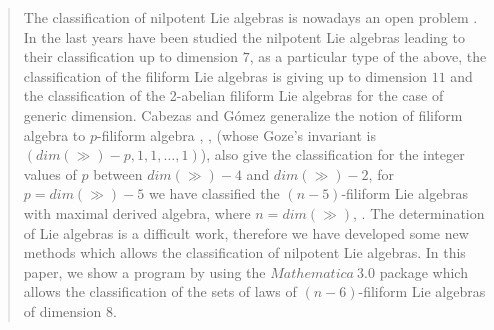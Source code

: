 \maketitle
\begin{abstract}
The classification of nilpotent Lie algebras is
nowadays an open problem \cite{biblia}. In the last years have
been studied the nilpotent Lie algebras leading to
their classification up to dimension $7$, as a
particular type of the above, the classification
of the filiform Lie algebras is giving up to
dimension $11$ and the classification of the
2-abelian filiform Lie algebras for the case of
generic dimension. Cabezas and G\'{o}mez generalize
the notion of filiform algebra to $p$-filiform
algebra \cite{articulo kluwer}, \cite{Comm(n-4)},
\cite{extracta} (whose Goze's invariant is
$(dim(\gg)-p,1,1,\dots,1)$), also give the
classification for the integer values of $p$
between $dim(\gg)-4$ and $dim(\gg)-2$, for
$p=dim(\gg)-5$ we have classified the
$(n-5)$-filiform Lie algebras with maximal derived
algebra, where $n=dim(\gg)$, \cite{jljr}.
The determination of Lie algebras is a difficult
work, therefore we have developed some new methods
which allows the classification of nilpotent Lie
algebras.
In this paper, we show a program by using the
$Mathematica\ 3.0$ package which allows the
classification of the sets of laws of
$(n-6)$-filiform Lie algebras of dimension $8$.
\end{abstract}
